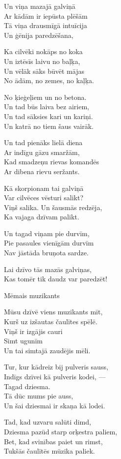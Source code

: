 \documentclass[14pt]{extarticle}
\begin{document}
Un viņa mazajā galviņā\\
Ar kādām ir iepūsta plēšām\\
Tā viņa drausmīgā intuīcija\\
Un ģēnija paredzēšana,

Ka cilvēki nokāps no koka\\
Un iztēsīs laivu no baļķa,\\
Un vēlāk sāks būvēt mājas\\
No ādām, no zemes, no kaļķa.

No ķieģeļiem un no betona.\\
Un tad būs laiva bez airiem,\\
Un tad sāksies kari un kariņi.\\
Un katrā no tiem šaus vairāk.

Un tad pienāks lielā diena\\
Ar indīgu gāzu smaržām,\\
Kad smadzeņu rievas komandēs\\
Ar dibena rievu seržants.

Kā skorpionam tai galviņā\\
Var cilvēces vēsturi salikt?\\
Viņš salika. Un šausmās redzēja,\\
Ka vajaga dzīvam palikt.

Un tagad viņam pie durvīm,\\
Pie pasaules vienīgām durvīm\\
Nav jāstāda bruņota sardze.

Lai dzīvo tās mazās galviņas,\\
Kas tomēr tik daudz var paredzēt!


\newpage

{\large \sc Mēmais muzikants}

Mūsu dzīvē viens muzikants mīt,\\
Kurš uz izšautas čaulītes spēlē.\\
Viņš ir izgājis cauri\\
Simt ugunīm\\
Un tai simtajā zaudējis mēli.

Tur, kur kādreiz bij pulveris sauss,\\
Indīgs dzīvei kā pulveris kodei, ---\\
Tagad dziesma.\\
Tā dūc mums pie auss,\\
Un šai dziesmai ir skaņa kā lodei.

Tad, kad uzvaru salūti dimd,\\
Dziesma pazūd starp orķestra paliem,\\
Bet, kad svinības paiet un rimst,\\
Tukšās čaulītēs mūzika paliek.
\end{document}
